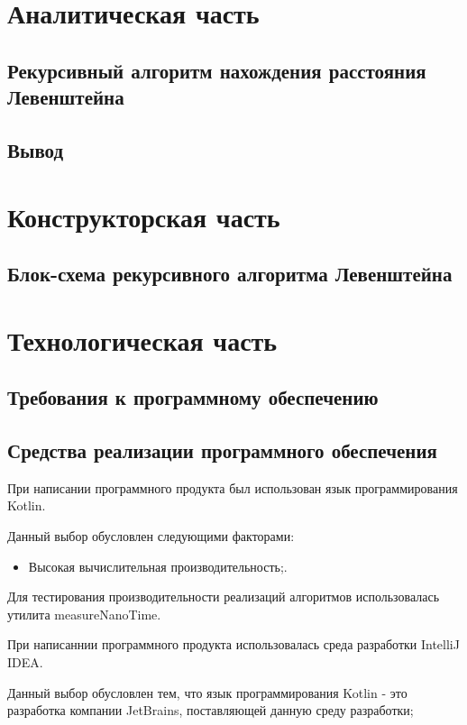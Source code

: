 \documentclass[12pt]{report}
\begin{document}
\chapter{Аналитическая часть}


\section{Рекурсивный алгоритм нахождения расстояния Левенштейна}

\section*{Вывод}

\newpage

\chapter{Конструкторская часть}
\section{Блок-схема рекурсивного алгоритма Левенштейна}


\chapter{Технологическая часть}
\section{Требования к программному обеспечению}

\section{Средства реализации программного обеспечения}
При написании программного продукта был использован язык программирования Kotlin.

Данный выбор обусловлен следующими факторами:
\begin{itemize}
\item Высокая вычислительная производительность;.
\end{itemize}

Для тестирования производительности реализаций алгоритмов использовалась утилита measureNanoTime.

При написаннии программного продукта использовалась среда разработки IntelliJ IDEA.

Данный выбор обусловлен тем, что язык программирования Kotlin - это разработка компании JetBrains, поставляющей данную среду разработки;
\end{document}
